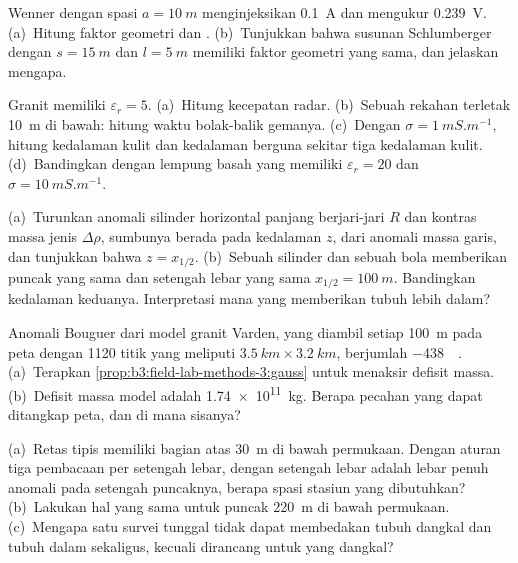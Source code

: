 \begin{exercise}[$\star$]\label{exo:b3:field-lab-methods-3:3}
 Wenner dengan spasi $a = \qty{10}{m}$ menginjeksikan \qty{0.1}{A} dan
mengukur \qty{0.239}{V}. (a)~Hitung faktor geometri dan
. (b)~Tunjukkan bahwa susunan Schlumberger dengan $s =
\qty{15}{m}$ dan $l = \qty{5}{m}$ memiliki faktor geometri yang sama, dan
jelaskan mengapa.
\end{exercise}

\begin{exercise}[$\star$]\label{exo:b3:field-lab-methods-3:4}
Granit memiliki $\varepsilon_r = 5$. (a)~Hitung kecepatan radar. (b)~Sebuah
rekahan terletak \qty{10}{m} di bawah: hitung waktu bolak-balik gemanya.
(c)~Dengan $\sigma = \qty{1}{mS.m^{-1}}$, hitung kedalaman kulit dan
kedalaman berguna sekitar tiga kedalaman kulit. (d)~Bandingkan dengan lempung basah
yang memiliki $\varepsilon_r = 20$ dan $\sigma = \qty{10}{mS.m^{-1}}$.
\end{exercise}

\begin{exercise}[$\star\star$]\label{exo:b3:field-lab-methods-3:5}
(a)~Turunkan anomali silinder horizontal panjang berjari-jari $R$ dan
kontras massa jenis $\Delta\rho$, sumbunya berada pada kedalaman $z$, dari anomali
massa garis, dan tunjukkan bahwa $z = x_{1/2}$. (b)~Sebuah silinder dan sebuah bola
memberikan puncak yang sama dan setengah lebar yang sama $x_{1/2} = \qty{100}{m}$.
Bandingkan kedalaman keduanya. Interpretasi mana yang memberikan tubuh lebih dalam?
\end{exercise}

\begin{exercise}[$\star\star$]\label{exo:b3:field-lab-methods-3:6}
Anomali Bouguer dari model granit Varden, yang diambil setiap
\qty{100}{m} pada peta dengan \num{1120} titik yang meliputi $\qty{3.5}{km}
\times \qty{3.2}{km}$, berjumlah \qty{-438}{\milli\gal}. (a)~Terapkan
\cref{prop:b3:field-lab-methods-3:gauss} untuk menaksir defisit massa.
(b)~Defisit massa model adalah \qty{1.74e11}{kg}. Berapa pecahan yang
dapat ditangkap peta, dan di mana sisanya?
\end{exercise}

\begin{exercise}[$\star\star$]\label{exo:b3:field-lab-methods-3:7}
(a)~Retas tipis memiliki bagian atas \qty{30}{m} di bawah permukaan. Dengan aturan tiga
pembacaan per setengah lebar, dengan setengah lebar adalah lebar penuh
anomali pada setengah puncaknya, berapa spasi stasiun yang dibutuhkan? (b)~Lakukan hal yang sama
untuk puncak \qty{220}{m} di bawah permukaan. (c)~Mengapa satu survei tunggal tidak
dapat membedakan tubuh dangkal dan tubuh dalam sekaligus, kecuali dirancang untuk
yang dangkal?
\end{exercise}

